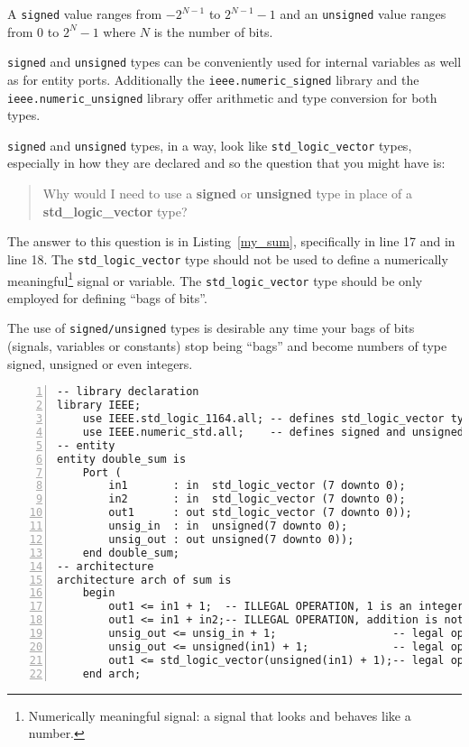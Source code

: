 A \texttt{signed} value ranges from $-2^{N-1}$ to $2^{N-1}-1$ and an \texttt{unsigned} value ranges from $0$ to $2^N-1$ where $N$ is the number of bits.

\texttt{signed} and \texttt{unsigned} types can be conveniently used for internal variables as well as for entity ports. Additionally the \texttt{ieee.numeric\_signed} library and the \texttt{ieee.numeric\_unsigned} library offer arithmetic and type conversion for both types.

\texttt{signed} and \texttt{unsigned} types, in a way, look like \texttt{std\_logic\_vector} types, especially in how they are declared and so the question that you might have is:
\begin{quotation}\ttfamily
Why would I need to use a \textbf{\color{gray}signed} or \textbf{\color{gray}unsigned} type in place of a \textbf{\color{gray}std\_logic\_vector} type?
\end{quotation}
The answer to this question is in Listing~\ref{my_sum}, specifically in line 17 and in line 18. The \texttt{std\_logic\_vector} type should not be used to define a numerically meaningful\footnote{Numerically meaningful signal: a signal that looks and behaves like a number.} signal or variable. The \texttt{std\_logic\_vector} type should be only employed for defining ``bags of bits''.

The use of \texttt{signed/unsigned} types is desirable any time your bags of bits (signals, variables or constants) stop being ``bags'' and become numbers of type signed, unsigned or even integers.

\noindent
\begin{minipage}{0.99\linewidth}
\begin{lstlisting}[numbers=left, label=my_sum, caption= Use of unsigned types in your code.]
-- library declaration
library IEEE;
    use IEEE.std_logic_1164.all; -- defines std_logic_vector type
    use IEEE.numeric_std.all;    -- defines signed and unsigned types
-- entity
entity double_sum is
    Port (
        in1       : in  std_logic_vector (7 downto 0);
        in2       : in  std_logic_vector (7 downto 0);
        out1      : out std_logic_vector (7 downto 0));
        unsig_in  : in  unsigned(7 downto 0);
        unsig_out : out unsigned(7 downto 0));
    end double_sum;
-- architecture
architecture arch of sum is
    begin
        out1 <= in1 + 1;  -- ILLEGAL OPERATION, 1 is an integer
        out1 <= in1 + in2;-- ILLEGAL OPERATION, addition is not defined
        unsig_out <= unsig_in + 1;                  -- legal operation
        unsig_out <= unsigned(in1) + 1;             -- legal operation
        out1 <= std_logic_vector(unsigned(in1) + 1);-- legal operation
    end arch;
\end{lstlisting}
\end{minipage}

